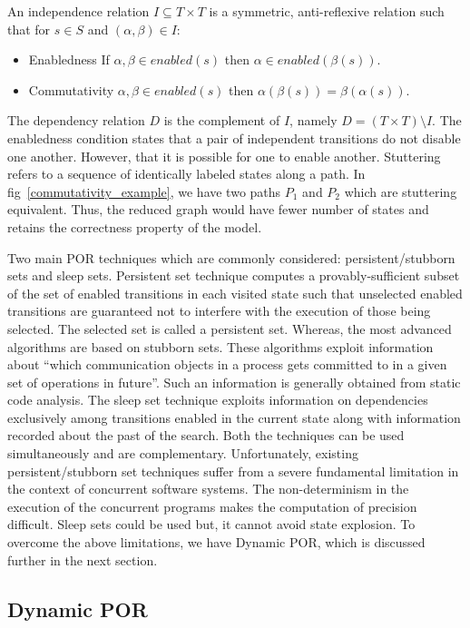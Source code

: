 An independence relation $I \subseteq T \times T$ is a symmetric, anti-reflexive relation such that for $s \in S$ and $(\alpha, \beta) \in I$:
\begin{itemize}
\item Enabledness 	If $\alpha,\beta \in enabled(s)$ then $\alpha \in enabled(\beta(s))$.
\item Commutativity	$\alpha, \beta \in enabled(s)$ then $\alpha(\beta(s)) = \beta(\alpha(s))$.
\end{itemize}
The dependency relation $D$ is the complement of $I$, namely $D = (T \times T) \setminus I$. The enabledness condition states that a pair of independent transitions do not disable one another. 
However, that it is possible for one to enable another. 
Stuttering refers to a sequence of identically labeled states along a path. 
In fig~\ref{commutativity_example}, we have two paths $P_1$ and $P_2$ which are stuttering equivalent. 
Thus, the reduced graph would have fewer number of states and retains the correctness property of the model. 

Two main POR techniques which are commonly considered: persistent/stubborn sets and sleep sets. 
Persistent set technique computes a provably-sufficient subset of the set of enabled transitions in each visited state such that unselected enabled transitions are guaranteed not to interfere with the execution of those being selected. 
The selected set is called a persistent set. 
Whereas, the most advanced algorithms are based on stubborn sets. 
These algorithms exploit information about ``which communication objects in a process gets committed to in a given set of operations in future''\cite{dynamic_por}. 
Such an information is generally obtained from static code analysis. 
The sleep set technique exploits information on dependencies exclusively among transitions enabled in the current state along with information recorded about the past of the search. 
Both the techniques can be used simultaneously and are complementary. 
Unfortunately, existing persistent/stubborn set techniques suffer from a severe fundamental limitation in the context of concurrent software systems. 
The non-determinism in the execution of the concurrent programs makes the computation of precision difficult. 
Sleep sets could be used but, it cannot avoid state explosion. 
To overcome the above limitations, we have Dynamic POR, which is discussed further in the next section. 

\subsection{Dynamic POR}

